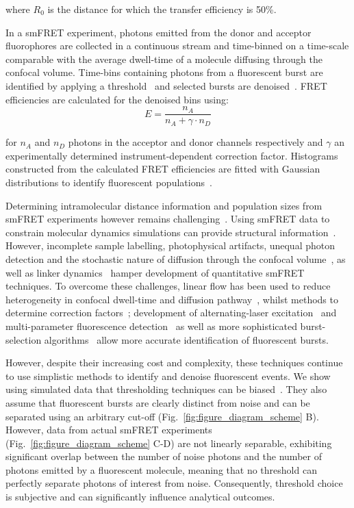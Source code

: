 where $R_0$ is the distance for which the transfer efficiency is 50\%. 

In a smFRET experiment, photons emitted from the donor and acceptor fluorophores are collected in a continuous stream and time-binned on a time-scale comparable with the average dwell-time of a molecule diffusing through the confocal volume.  Time-bins containing photons from a fluorescent burst are identified by applying a threshold~\cite{deniz01, gell06, ying00} and selected bursts are denoised~\cite{nir06}.  FRET efficiencies are calculated for the denoised bins using: 
\begin{equation}
E = \frac{n_A}{n_A + \gamma \cdot n_D}
\label{eq:Eprod}
\end{equation} 

for $n_A$ and $n_D$ photons in the acceptor and donor channels respectively and $\gamma$ an experimentally determined instrument-dependent correction factor.  Histograms constructed from the calculated FRET efficiencies are fitted with Gaussian distributions to identify fluorescent populations~\cite{ha96}.

Determining intramolecular distance information and population sizes from smFRET experiments however remains challenging~\cite{nir06}.  Using smFRET data to constrain molecular dynamics simulations can provide structural information~\cite{kalinin2012, Hoefling2011}. However, incomplete sample labelling, photophysical artifacts, unequal photon detection and the stochastic nature of diffusion through the confocal volume~\cite{nir06}, as well as linker dynamics~\cite{sindbert2011} hamper development of quantitative smFRET techniques.  To overcome these challenges, linear flow has been used to reduce heterogeneity in confocal dwell-time and diffusion pathway~\cite{vogelsang07, horrocks12}, whilst methods to determine correction factors~\cite{deniz99}; development of alternating-laser excitation~\cite{kapanidis05, muller05, doose07, kudryavtsev2012} and multi-parameter fluorescence detection~\cite{sisamakis2010} as well as more sophisticated burst-selection algorithms~\cite{eggeling01, nir06} allow more accurate identification of fluorescent bursts.

However, despite their increasing cost and complexity, these techniques continue to use simplistic methods to identify and denoise fluorescent events.  We show using simulated data that thresholding techniques can be biased~\cite{deniz01, gell06}.  They also assume that fluorescent bursts are clearly distinct from noise and can be separated using an arbitrary cut-off (Fig.~\ref{fig:figure_diagram_scheme} B).  However, data from actual smFRET experiments (Fig.~\ref{fig:figure_diagram_scheme} C-D) are not linearly separable, exhibiting significant overlap between the number of noise photons and the number of photons emitted by a fluorescent molecule, meaning that no threshold can perfectly separate photons of interest from noise.  Consequently, threshold choice is subjective and can significantly influence analytical outcomes.


